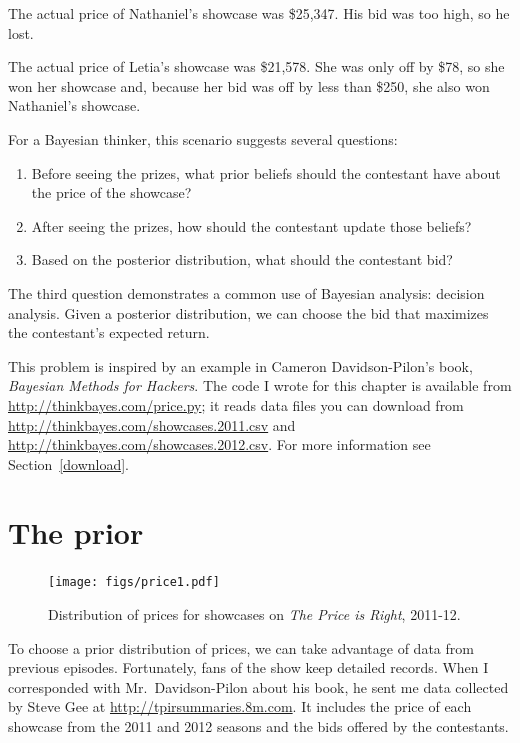 \documentclass[12pt]{book}
\theoremstyle{exercise}
\begin{document}
The actual price of Nathaniel's showcase was \$25,347.  His bid
was too high, so he lost.

The actual price of Letia's showcase was \$21,578.  She was only
off by \$78, so she won her showcase and, because
her bid was off by less than \$250, she also won Nathaniel's
showcase.

For a Bayesian thinker, this scenario suggests several questions:

\begin{enumerate}

\item Before seeing the prizes, what prior beliefs should the
  contestant have about the price of the showcase?

\item After seeing the prizes, how should the contestant update
  those beliefs?

\item Based on the posterior distribution, what should the
  contestant bid?

\end{enumerate}

The third question demonstrates a common use of Bayesian analysis:
decision analysis.  Given a posterior distribution, we can choose
the bid that maximizes the contestant's expected return.

This problem is inspired by an example in Cameron Davidson-Pilon's
book, {\it Bayesian Methods for Hackers}.  The code I wrote for this
chapter is available from \url{http://thinkbayes.com/price.py}; it
reads data files you can download from
\url{http://thinkbayes.com/showcases.2011.csv} and
\url{http://thinkbayes.com/showcases.2012.csv}.    For more information
see Section~\ref{download}.


\section{The prior}

\begin{figure}
\centerline{\texttt{[image: figs/price1.pdf]}}
\caption{Distribution of prices for showcases on
{\it The Price is Right}, 2011-12.}
\label{fig.price1}
\end{figure}

To choose a prior distribution of prices, we can take advantage
of data from previous episodes.  Fortunately, fans of the show
keep detailed records.  When I corresponded with Mr.~Davidson-Pilon
about his book, he sent me data collected by Steve Gee at
\url{http://tpirsummaries.8m.com}.  It includes the price of
each showcase from the 2011 and 2012 seasons and the bids
offered by the contestants.
\end{document}
